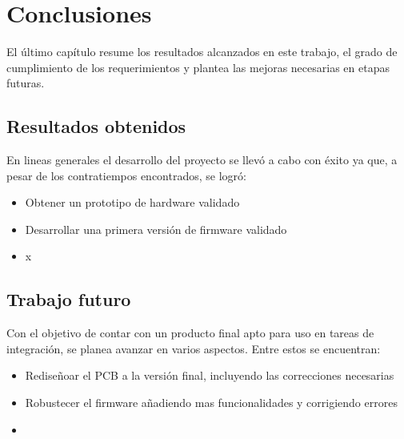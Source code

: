 
\chapter{Conclusiones} %

\label{Chapter5} %



El último capítulo resume los resultados alcanzados en este trabajo, el grado de cumplimiento de los requerimientos y plantea las mejoras necesarias en etapas futuras.

\section{Resultados obtenidos}

En lineas generales el desarrollo del proyecto se llevó a cabo con éxito ya que, a pesar de los contratiempos encontrados, se logró:  

\begin{itemize}
\item Obtener un prototipo de hardware validado
\item Desarrollar una primera versión de firmware validado
\item x
\end{itemize}

\section{Trabajo futuro}

Con el objetivo de contar con un producto final apto para uso en tareas de integración,  se planea avanzar en varios aspectos. Entre estos se encuentran:

\begin{itemize}
\item Rediseñoar el PCB a la versión final, incluyendo las correcciones necesarias
\item Robustecer el firmware añadiendo mas funcionalidades y corrigiendo errores
\item 
\end{itemize}